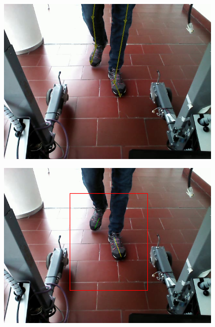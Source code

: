 \documentclass[a4paper]{report}
\begin{document}

\begin{figure}[H]
\centering
\begin{minipage}{.5\textwidth}
  \centering
    \includegraphics[width=0.98\textwidth]{images/building/results/frameGT10.png}
\end{minipage}%
\begin{minipage}{.5\textwidth}
  \centering
    \includegraphics[width=0.98\textwidth]{images/building/results/frame10.png}
    \label{img:Frame10}
\end{minipage}%
\end{figure}
\end{document}
